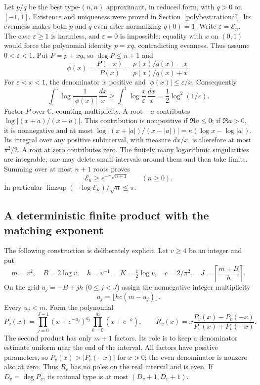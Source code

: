 \documentclass[11pt]{article}
\newcommand{\C}{\mathbb C}
\theoremstyle{remark}
\numberwithin{equation}{section}
\begin{document}
Let $p/q$ be the best type-$(n,n)$ approximant, in reduced form, with
$q>0$ on $[-1,1]$. Existence and uniqueness were proved in
Section~\ref{polybest:rational}. Its evenness makes both $p$ and $q$
even after normalizing $q(0)=1$. Write $\varepsilon=\mathcal E_n$.
The case $\varepsilon\ge1$ is harmless, and $\varepsilon=0$ is
impossible: equality with $x$ on $(0,1)$ would force the polynomial
identity $p=xq$, contradicting evenness. Thus assume $0<\varepsilon<1$.
Put $P=p+xq$, so $\deg P\le n+1$ and
\[
 \phi(x)=\frac{P(-x)}{P(x)}
 =\frac{p(x)/q(x)-x}{p(x)/q(x)+x}.
\]
For $\varepsilon<x<1$, the denominator is positive and
$|\phi(x)|\le\varepsilon/x$. Consequently
\[
 \int_\varepsilon^1\log\frac1{|\phi(x)|}\,\frac{dx}{x}
 \ge\int_\varepsilon^1\log\frac{x}{\varepsilon}\,\frac{dx}{x}
 =\frac12\log^2(1/\varepsilon).
\]
Factor $P$ over $\C$, counting multiplicity. A root $-a$ contributes
$\log|(x+a)/(x-a)|$. This contribution is nonpositive if $\Re a\le0$;
if $\Re a>0$, it is nonnegative and at most
$\log|(x+|a|)/(x-|a|)|=\kappa(\log x-\log|a|)$.
Its integral over any positive subinterval, with measure $dx/x$, is
therefore at most $\pi^2/2$. A root at zero contributes zero.
The finitely many logarithmic singularities are integrable; one may
delete small intervals around them and then take limits. Summing over
at most $n+1$ roots proves
\begin{equation}\label{retryroot:rational-lower}
 \boxed{\mathcal E_n\ge e^{-\pi\sqrt{n+1}}}\qquad(n\ge0).
\end{equation}
In particular $\limsup(-\log\mathcal E_n)/\sqrt n\le\pi$.

\subsection{A deterministic finite product with the matching exponent}
The following construction is deliberately explicit. Let $v\ge4$ be
an integer and put
\[
 m=v^2,\quad B=2\log v,\quad h=v^{-1},\quad K=\tfrac12\log v,
 \quad c=2/\pi^2,\quad J=\left\lceil\frac{m+B}{h}\right\rceil.
\]
On the grid $u_j=-B+jh$ ($0\le j<J$) assign the nonnegative integer
multiplicity
\[
 a_j=\lfloor h c(m-u_j)\rfloor.
\]
Every $u_j<m$. Form the polynomial
\begin{equation}\label{retryroot:taper-product}
 P_v(x)=
 \prod_{j=0}^{J-1}(x+e^{-u_j})^{a_j}
 \prod_{k=0}^{m}(x+e^{-k}),
 \qquad
 R_v(x)=x\frac{P_v(x)-P_v(-x)}{P_v(x)+P_v(-x)}.
\end{equation}
The second product has only $m+1$ factors. Its role is to keep a
denominator estimate uniform near the end of the interval.
All factors have positive parameters, so
$P_v(x)>|P_v(-x)|$ for $x>0$; the even denominator is nonzero also at
zero. Thus $R_v$ has no poles on the real interval and is even.
If $D_v=\deg P_v$, its rational type is at most $(D_v+1,D_v+1)$.
\end{document}
